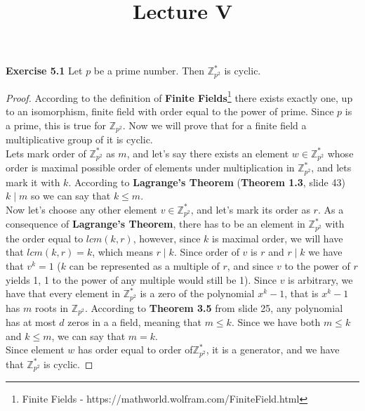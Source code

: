 \documentclass{article}
\title{\vspace{-2cm}Lecture V\vspace{-2cm}}
\date{}
\begin{document}
\maketitle
\noindent \textbf{Exercise 5.1}  Let $p$ be a prime number. Then $\mathbb{Z}^{*}_{p^2}$ is cyclic.
\begin{proof}
According to the definition of \textbf{Finite Fields}\footnote{Finite Fields - https://mathworld.wolfram.com/FiniteField.html} there exists exactly one, up to an isomorphism, finite field with order equal to the power of prime. Since $p$ is a prime, this is true for $\mathbb{Z}_{p^2}$. Now we will prove that for a finite field a multiplicative group of it is cyclic.\\
Lets mark order of $\mathbb{Z}_{p^2}^{*}$ as $m$, and let's say there exists an element $w \in \mathbb{Z}_{p^2}^{*}$ whose order is maximal possible order of elements under multiplication in $\mathbb{Z}_{p^2}^{*}$, and lets mark it with $k$. According to \textbf{Lagrange's Theorem} (\textbf{Theorem 1.3}, slide 43) $k \mid m$ so we can say that $k \leq m$.\\
Now let's choose any other element $v \in \mathbb{Z}_{p^2}^{*}$, and let's mark its order as $r$. As a consequence of \textbf{Lagrange's Theorem}, there has to be an element in $\mathbb{Z}_{p^2}^{*}$ with the order equal to $lcm(k,r)$, however, since $k$ is maximal order, we will have that $lcm(k,r)=k$, which means $r \mid k$. Since order of $v$ is $r$ and $r \mid k$ we have that $v^{k} = 1$ ($k$ can be represented as a multiple of $r$, and since $v$ to the power of $r$ yields 1, 1 to the power of any multiple would still be 1). Since $v$ is arbitrary, we have that every element in $\mathbb{Z}_{p^2}^{*}$ is a zero of the polynomial $x^k -1$, that is $x^k - 1$ has $m$ roots in $\mathbb{Z}_{p^2}$. According to \textbf{Theorem 3.5} from slide 25, any polynomial has at most $d$ zeros in a a field, meaning that $m \leq k$. Since we have both $m \leq k$ and $k \leq m$, we can say that $m = k$.\\
Since element $w$ has order equal to order of$\mathbb{Z}_{p^2}^{*}$, it is a generator, and we have that $\mathbb{Z}_{p^2}^{*}$ is cyclic.
\end{proof}
\end{document}
